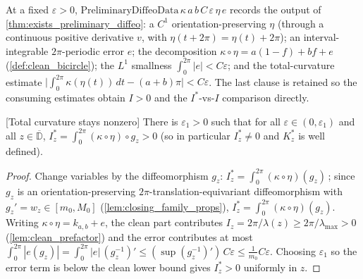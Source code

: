 \begin{definition}

  \label{def:preliminary_diffeo_data}
  At a fixed $\varepsilon>0$, $\mathrm{PreliminaryDiffeoData}\,\kappa\,a\,b\,C\,\varepsilon\,\eta\,e$
  records the output of \cref{thm:exists_preliminary_diffeo}: a $C^1$
  orientation-preserving $\eta$ (through a continuous positive derivative $v$, with
  $\eta(t+2\pi)=\eta(t)+2\pi$); an interval-integrable $2\pi$-periodic error $e$; the
  decomposition $\kappa\circ\eta=a(1-f)+bf+e$ (\cref{def:clean_bicircle}); the $L^1$
  smallness $\int_0^{2\pi}|e|<C\varepsilon$; and the total-curvature estimate
  $\bigl|\int_0^{2\pi}\kappa(\eta(t))\,dt-(a+b)\pi\bigr|<C\varepsilon$. The last
  clause is retained so the consuming estimates obtain $I>0$ and the $I^*$-vs-$I$
  comparison directly.
\end{definition}

\begin{lemma}

[Total curvature stays nonzero]
  \label{lem:total_curvature_ne_zero}
  There is $\varepsilon_1>0$ such that for all $\varepsilon\in(0,\varepsilon_1)$
  and all $z\in\overline{\mathbb{D}}$, $I^*_z=\int_0^{2\pi}(\kappa\circ\eta)\circ
  g_z>0$ (so in particular $I^*_z\neq 0$ and $K^*_z$ is well defined).
\end{lemma}
\begin{proof}
  Change variables by the diffeomorphism $g_z$:
  $I^*_z=\int_0^{2\pi}(\kappa\circ\eta)(g_z)\,$; since $g_z$ is an
  orientation-preserving $2\pi$-translation-equivariant diffeomorphism with
  $g_z'=w_z\in[m_0,M_0]$ (\cref{lem:closing_family_props}), $I^*_z=\int_0^{2\pi}(\kappa\circ\eta)(g_z)$.
  Writing $\kappa\circ\eta=k_{a,b}+e$, the clean part contributes
  $I_z=2\pi/\lambda(z)\ge 2\pi/\lambda_{\max}>0$ (\cref{lem:clean_prefactor}) and the
  error contributes at most $\int_0^{2\pi}|e(g_z)|=\int_0^{2\pi}|e|\,(g_z^{-1})'\le
  (\sup(g_z^{-1})')\,C\varepsilon\le \tfrac1{m_0}C\varepsilon$. Choosing
  $\varepsilon_1$ so the error term is below the clean lower bound gives $I^*_z>0$
  uniformly in $z$.
\end{proof}

